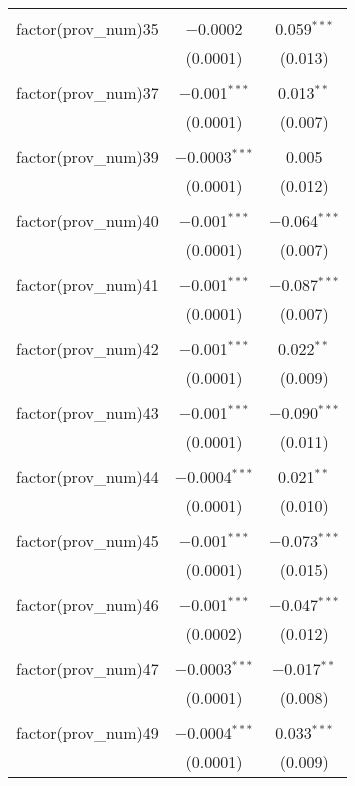 \begin{table}[ht!]
\begin{tabular}{@{\extracolsep{5pt}}lcc}
  & & \\ 
 factor(prov\_num)35 & $-$0.0002 & 0.059$^{***}$ \\ 
  & (0.0001) & (0.013) \\ 
  & & \\ 
 factor(prov\_num)37 & $-$0.001$^{***}$ & 0.013$^{**}$ \\ 
  & (0.0001) & (0.007) \\ 
  & & \\ 
 factor(prov\_num)39 & $-$0.0003$^{***}$ & 0.005 \\ 
  & (0.0001) & (0.012) \\ 
  & & \\ 
 factor(prov\_num)40 & $-$0.001$^{***}$ & $-$0.064$^{***}$ \\ 
  & (0.0001) & (0.007) \\ 
  & & \\ 
 factor(prov\_num)41 & $-$0.001$^{***}$ & $-$0.087$^{***}$ \\ 
  & (0.0001) & (0.007) \\ 
  & & \\ 
 factor(prov\_num)42 & $-$0.001$^{***}$ & 0.022$^{**}$ \\ 
  & (0.0001) & (0.009) \\ 
  & & \\ 
 factor(prov\_num)43 & $-$0.001$^{***}$ & $-$0.090$^{***}$ \\ 
  & (0.0001) & (0.011) \\ 
  & & \\ 
 factor(prov\_num)44 & $-$0.0004$^{***}$ & 0.021$^{**}$ \\ 
  & (0.0001) & (0.010) \\ 
  & & \\ 
 factor(prov\_num)45 & $-$0.001$^{***}$ & $-$0.073$^{***}$ \\ 
  & (0.0001) & (0.015) \\ 
  & & \\ 
 factor(prov\_num)46 & $-$0.001$^{***}$ & $-$0.047$^{***}$ \\ 
  & (0.0002) & (0.012) \\ 
  & & \\ 
 factor(prov\_num)47 & $-$0.0003$^{***}$ & $-$0.017$^{**}$ \\ 
  & (0.0001) & (0.008) \\ 
  & & \\ 
 factor(prov\_num)49 & $-$0.0004$^{***}$ & 0.033$^{***}$ \\ 
  & (0.0001) & (0.009) \\ 

\end{tabular}
\end{table}
